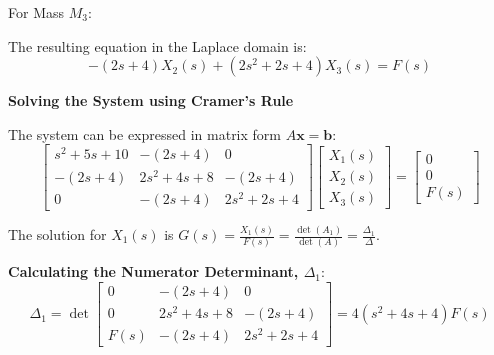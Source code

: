 ﻿\documentclass[11pt]{article}
\begin{document}
\vspace{12pt}
{For Mass $M_3$:}
\begin{figure}[h!]
\centering
{}
\end{figure}

The resulting equation in the Laplace domain is:
\begin{equation}
-(2s + 4)X_2(s) + (2s^2 + 2s + 4)X_3(s) = F(s) \tag{3}
\end{equation}

\noindent\textbf{Solving the System using Cramer's Rule}
\vspace{12pt}

The system can be expressed in matrix form $A\mathbf{x} = \mathbf{b}$:
$$
\begin{bmatrix}
s^2 + 5s + 10 & -(2s + 4) & 0 \\
-(2s + 4) & 2s^2 + 4s + 8 & -(2s + 4) \\
0 & -(2s + 4) & 2s^2 + 2s + 4
\end{bmatrix}
\begin{bmatrix}
X_1(s) \\
X_2(s) \\
X_3(s)
\end{bmatrix}
=
\begin{bmatrix}
0 \\
0 \\
F(s)
\end{bmatrix}
$$

The solution for $X_1(s)$ is $G(s) = \frac{X_1(s)}{F(s)} = \frac{\det(A_1)}{\det(A)} = \frac{\Delta_1}{\Delta}$.

\vspace{12pt}
\noindent\textbf{Calculating the Numerator Determinant, $\Delta_1$}:
$$ \Delta_1 = \det
\begin{bmatrix}
0 & -(2s + 4) & 0 \\
0 & 2s^2 + 4s + 8 & -(2s + 4) \\
F(s) & -(2s + 4) & 2s^2 + 2s + 4
\end{bmatrix}
= 4(s^2 + 4s + 4)F(s) $$
\end{document}
